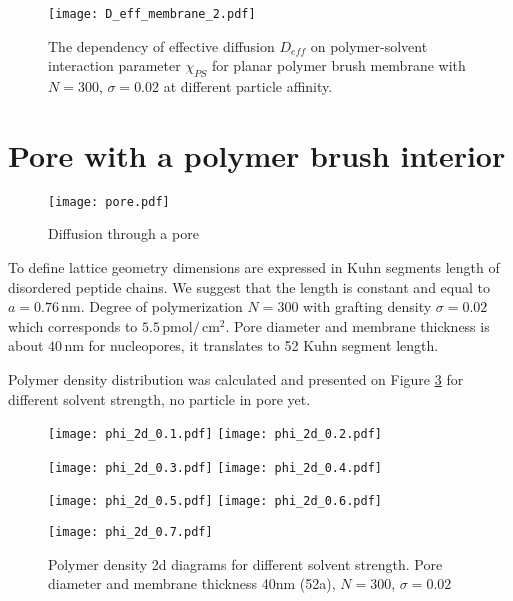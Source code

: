 \documentclass[12pt,a4paper]{article}
\newcommand{\unit}[1]{\ensuremath{\, \mathrm{#1}}}
\begin{document}
\begin{figure}
    \center
    \texttt{[image: D\_eff\_membrane\_2.pdf]}
    \caption{The dependency of effective diffusion $D_{eff}$ on polymer-solvent interaction parameter $\chi_{PS}$ for planar polymer brush membrane with $N=300$, $\sigma = 0.02$ at different particle affinity.}
    \label{fig:D_eff_planar_2}
\end{figure}

\section{Pore with a polymer brush interior}

\begin{figure}
    \center
    \texttt{[image: pore.pdf]}
    \caption{Diffusion through a pore}
    \label{fig:membrane}
\end{figure}

To define lattice geometry dimensions are expressed in Kuhn segments length of disordered peptide chains. We suggest that the length is constant and equal to $a = 0.76 \unit{nm}$.
Degree of polymerization $N=300$ with grafting density $\sigma=0.02$ which corresponds to $5.5 \unit{pmol}/\unit{cm}^2$. 
Pore diameter and membrane thickness is about $40 \unit{nm}$ for nucleopores, it translates to 52 Kuhn segment length.

Polymer density distribution was calculated and presented on Figure \ref{fig:phi2d} for different solvent strength, no particle in pore yet.

\begin{figure}
    \center
    \hspace*{-0.3in}
    \texttt{[image: phi\_2d\_0.1.pdf]}
    \hspace*{-0.6in}
    \texttt{[image: phi\_2d\_0.2.pdf]}
    \vspace*{-0.6in}

    \hspace*{-0.3in}
    \texttt{[image: phi\_2d\_0.3.pdf]}
    \hspace*{-0.6in}
    \texttt{[image: phi\_2d\_0.4.pdf]}
    \vspace*{-0.6in}

    \hspace*{-0.3in}
    \texttt{[image: phi\_2d\_0.5.pdf]}
    \hspace*{-0.6in}
    \texttt{[image: phi\_2d\_0.6.pdf]}
    \vspace*{-0.6in}


    \texttt{[image: phi\_2d\_0.7.pdf]}
    \caption{Polymer density 2d diagrams for different solvent strength. 
    Pore diameter and membrane thickness 40nm (52a), $N=300$, $\sigma=0.02$}
    \label{fig:phi2d}
\end{figure}
\end{document}
